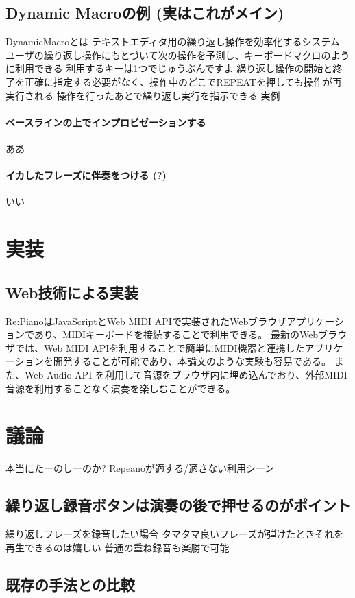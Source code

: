 \documentclass[submit,techreq]{ec2017}
\begin{document}
\subsection{Dynamic Macroの例 (実はこれがメイン)}
DynamicMacro\cite{Masui}とは
テキストエディタ用の繰り返し操作を効率化するシステム
ユーザの繰り返し操作にもとづいて次の操作を予測し、キーボードマクロのように利用できる
利用するキーは1つでじゅうぶんですよ
繰り返し操作の開始と終了を正確に指定する必要がなく、操作中のどこでREPEATを押しても操作が再実行される
操作を行ったあとで繰り返し実行を指示できる
実例
\paragraph*{ベースラインの上でインプロビゼーションする}
ああ
\paragraph*{イカしたフレーズに伴奏をつける (?)}
いい

\section{実装}

\subsection{Web技術による実装}
Re:PianoはJavaScriptとWeb MIDI API\cite{webmidi}で実装されたWebブラウザアプリケーションであり、MIDIキーボードを接続することで利用できる。
最新のWebブラウザでは、Web MIDI APIを利用することで簡単にMIDI機器と連携したアプリケーションを開発することが可能であり、本論文のような実験も容易である。
また、Web Audio API\cite{webaudio} を利用して音源をブラウザ内に埋め込んでおり、外部MIDI音源を利用することなく演奏を楽しむことができる。

\section{議論}

本当にたーのしーのか?
Repeanoが適する/適さない利用シーン
\subsection{繰り返し録音ボタンは演奏の後で押せるのがポイント}
繰り返しフレーズを録音したい場合
タマタマ良いフレーズが弾けたときそれを再生できるのは嬉しい
普通の重ね録音も楽勝で可能

\subsection{既存の手法との比較}
\end{document}
